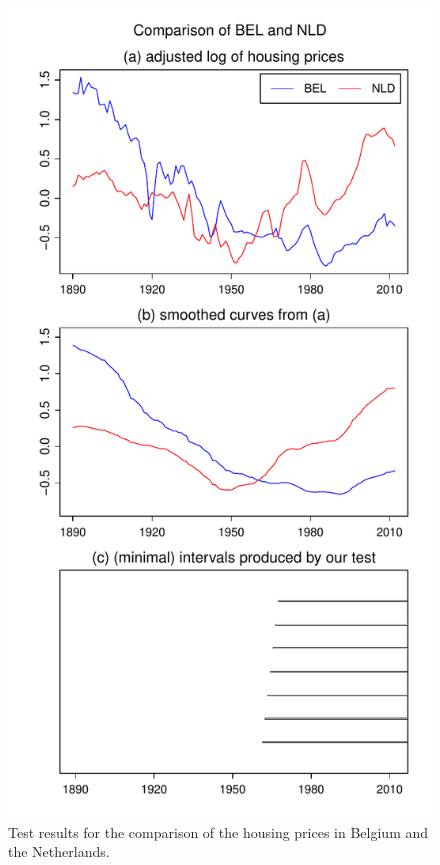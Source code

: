 \documentclass[a4paper,12pt]{article}
\begin{document}
\begin{figure}[p!]
\begin{minipage}[t]{0.49\textwidth}
\includegraphics[width=\textwidth]{Plots/hp_BEL_vs_NLD}
\caption{Test results for the comparison of the housing prices in Belgium and the Netherlands.}\label{fig:hp:Belgium:Netherlands}
\end{minipage}

\end{figure}
\end{document}
